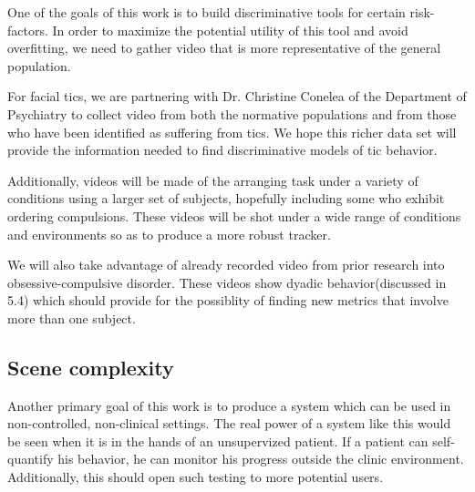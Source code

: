 \documentclass[11pt]{article}
\begin{document}
One of the goals of this work is to build discriminative tools for certain risk-factors. In order to maximize the potential utility of this tool and avoid overfitting, we need to gather video that is more representative of the general population.

For facial tics, we are partnering with Dr. Christine Conelea of the Department of Psychiatry to collect video from both the normative populations and from those who have been identified as suffering from tics. We hope this richer data set will provide the information needed to find discriminative models of tic behavior.

Additionally, videos will be made of the arranging task under a variety of conditions using a larger set of subjects, hopefully including some who exhibit ordering compulsions. These videos will be shot under a wide range of conditions and environments so as to produce a more robust tracker.

We will also take advantage of already recorded video from prior research into obsessive-compulsive disorder. These videos show dyadic behavior(discussed in 5.4) which should provide for the possiblity of finding new metrics that involve more than one subject.
\subsection{Scene complexity}
Another primary goal of this work is to produce a system which can be used in non-controlled, non-clinical settings. The real power of a system like this would be seen when it is in the hands of an unsupervized patient. If a patient can self-quantify his behavior, he can monitor his progress outside the clinic environment. Additionally, this should open such testing to more potential users.
\end{document}

